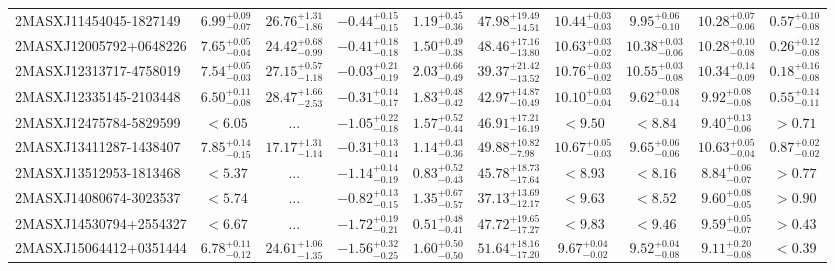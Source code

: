 \documentclass[onecolumn]{mn2e}
\begin{document}
\begin{landscape}
{\begin{center}
\begin{longtable}{lccccccccc}
2MASXJ11454045-1827149 & $6.99_{-0.07}^{+0.09}$ & $26.76_{-1.86}^{+1.31}$ & $-0.44_{-0.15}^{+0.15}$ & $1.19_{-0.36}^{+0.45}$ &$47.98_{-14.51}^{+19.49}$ & $10.44_{-0.03}^{+0.03}$ & $9.95_{-0.10}^{+0.06}$ & $10.28_{-0.06}^{+0.07}$ & $0.57_{-0.08}^{+0.10}$ \\
2MASXJ12005792+0648226 & $7.65_{-0.04}^{+0.05}$ & $24.42_{-0.99}^{+0.68}$ & $-0.41_{-0.18}^{+0.18}$ & $1.50_{-0.38}^{+0.49}$ &$48.46_{-13.80}^{+17.16}$ & $10.63_{-0.02}^{+0.03}$ & $10.38_{-0.06}^{+0.03}$ & $10.28_{-0.08}^{+0.10}$ & $0.26_{-0.08}^{+0.12}$ \\
2MASXJ12313717-4758019 & $7.54_{-0.03}^{+0.05}$ & $27.15_{-1.18}^{+0.57}$ & $-0.03_{-0.19}^{+0.21}$ & $2.03_{-0.49}^{+0.66}$ &$39.37_{-13.52}^{+21.42}$ & $10.76_{-0.02}^{+0.03}$ & $10.55_{-0.08}^{+0.03}$ & $10.34_{-0.09}^{+0.14}$ & $0.18_{-0.08}^{+0.16}$ \\
2MASXJ12335145-2103448 & $6.50_{-0.08}^{+0.11}$ & $28.47_{-2.53}^{+1.66}$ & $-0.31_{-0.17}^{+0.14}$ & $1.83_{-0.42}^{+0.48}$ &$42.97_{-10.49}^{+14.87}$ & $10.10_{-0.04}^{+0.03}$ & $9.62_{-0.14}^{+0.08}$ & $9.92_{-0.08}^{+0.08}$ & $0.55_{-0.11}^{+0.14}$ \\
2MASXJ12475784-5829599 & $<6.05$ & ... & $-1.05_{-0.18}^{+0.22}$ & $1.57_{-0.44}^{+0.52}$ &$46.91_{-16.19}^{+17.21}$ & $<9.50$ & $<8.84$ & $9.40_{-0.06}^{+0.13}$ & $>0.71$ \\
2MASXJ13411287-1438407 & $7.85_{-0.15}^{+0.14}$ & $17.17_{-1.14}^{+1.31}$ & $-0.31_{-0.14}^{+0.13}$ & $1.14_{-0.36}^{+0.43}$ &$49.88_{-7.98}^{+10.82}$ & $10.67_{-0.03}^{+0.05}$ & $9.65_{-0.06}^{+0.06}$ & $10.63_{-0.04}^{+0.05}$ & $0.87_{-0.02}^{+0.02}$ \\
2MASXJ13512953-1813468 & $<5.37$ & ... & $-1.14_{-0.19}^{+0.14}$ & $0.83_{-0.43}^{+0.52}$ &$45.78_{-17.64}^{+18.73}$ & $<8.93$ & $<8.16$ & $8.84_{-0.07}^{+0.06}$ & $>0.77$ \\
2MASXJ14080674-3023537 & $<5.74$ & ... & $-0.82_{-0.15}^{+0.13}$ & $1.35_{-0.57}^{+0.67}$ &$37.13_{-12.17}^{+13.69}$ & $<9.63$ & $<8.52$ & $9.60_{-0.05}^{+0.08}$ & $>0.90$ \\
2MASXJ14530794+2554327 & $<6.67$ & ... & $-1.72_{-0.21}^{+0.19}$ & $0.51_{-0.41}^{+0.48}$ &$47.72_{-17.27}^{+19.65}$ & $<9.83$ & $<9.46$ & $9.59_{-0.07}^{+0.05}$ & $>0.43$ \\
2MASXJ15064412+0351444 & $6.78_{-0.12}^{+0.11}$ & $24.61_{-1.35}^{+1.06}$ & $-1.56_{-0.25}^{+0.32}$ & $1.60_{-0.50}^{+0.50}$ &$51.64_{-17.20}^{+18.16}$ & $9.67_{-0.02}^{+0.04}$ & $9.52_{-0.08}^{+0.04}$ & $9.11_{-0.08}^{+0.20}$ & $<0.39$ \\

\end{longtable}
\end{center}}
\end{landscape}
\end{document}
